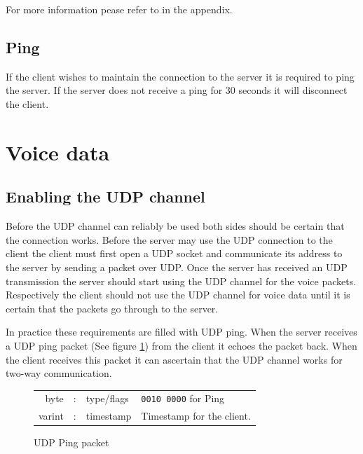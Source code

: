 \documentclass[11pt]{article} %
\begin{document}
For more information pease refer to  in the appendix.

\subsection {Ping}

If the client wishes to maintain the connection to the server it is required to ping the server. If the server does not receive a ping for 30 seconds it will disconnect the client.

\section {Voice data}

\subsection{Enabling the UDP channel}
\label{sect:udpping}

Before the UDP channel can reliably be used both sides should be certain that the connection works. Before the server may use the UDP connection to the client the client must first open a UDP socket and communicate its address to the server by sending a packet over UDP. Once the server has received an UDP transmission the server should start using the UDP channel for the voice packets. Respectively the client should not use the UDP channel for voice data until it is certain that the packets go through to the server.

In practice these requirements are filled with UDP ping. When the server receives a UDP ping packet (See figure \ref{fig:udpping}) from the client it echoes the packet back. When the client receives this packet it can ascertain that the UDP channel works for two-way communication.

\begin{figure}[htp]\begin{center}\begin{tabular}{|rcl|p{}}

\cline{1-3}
byte &:& type/flags & \texttt{0010 0000} for Ping \\
\cline{1-3}
varint &:& timestamp & Timestamp for the client. \\
\cline{1-3}

\end{tabular}
\caption{UDP Ping packet}\label{fig:udpping}
\end{center}\end{figure}
\end{document}
